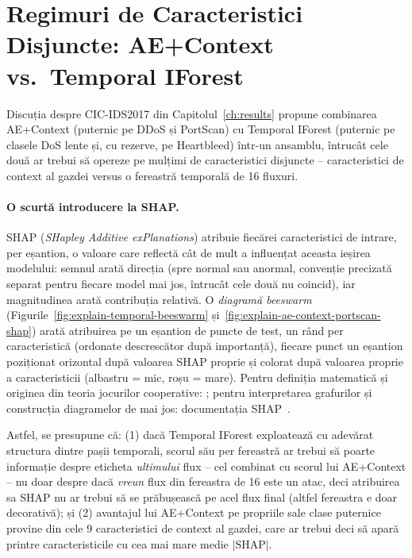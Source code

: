 \section{Regimuri de Caracteristici Disjuncte: AE+Context vs.\ Temporal IForest}
\label{sec:explain-disjoint-regime}

Discuția despre CIC-IDS2017 din Capitolul~\ref{ch:results} propune combinarea AE+Context (puternic pe DDoS și PortScan) cu Temporal IForest (puternic pe clasele DoS lente și, cu rezerve, pe Heartbleed) într-un ansamblu, întrucât cele două ar trebui să opereze pe mulțimi de caracteristici disjuncte
-- caracteristici de context al gazdei versus o fereastră temporală de 16 fluxuri.

\paragraph{O scurtă introducere la SHAP.} SHAP (\emph{SHapley Additive exPlanations}) atribuie fiecărei caracteristici de intrare, per eșantion, o valoare care reflectă cât de mult a influențat aceasta ieșirea modelului: semnul arată direcția (spre normal sau anormal, convenție precizată separat pentru fiecare model mai jos, întrucât cele două nu coincid), iar magnitudinea arată contribuția relativă.
O \emph{diagramă beeswarm} (Figurile~\ref{fig:explain-temporal-beeswarm} și~\ref{fig:explain-ae-context-portscan-shap}) arată atribuirea pe un eșantion de puncte de test, un rând per caracteristică (ordonate descrescător după importanță), fiecare punct un eșantion poziționat orizontal după valoarea SHAP proprie și colorat după valoarea proprie a caracteristicii (albastru = mic, roșu = mare). Pentru definiția matematică și originea din teoria jocurilor cooperative: \parencite{lundberg2017unified}; pentru interpretarea grafurilor și construcția diagramelor de mai jos: documentația SHAP~\cite{shap_docs}.

Astfel, se presupune că: (1) dacă Temporal IForest exploatează cu adevărat structura dintre pașii temporali, scorul său per fereastră ar trebui să poarte informație despre eticheta \emph{ultimului} flux -- cel combinat cu scorul lui AE+Context -- nu doar despre dacă \emph{vreun} flux din fereastra de 16 este un atac, deci atribuirea sa SHAP nu ar trebui să se prăbușească pe acel flux final (altfel fereastra e doar decorativă); și (2) avantajul lui AE+Context pe propriile sale clase puternice provine din cele 9 caracteristici de context al gazdei, care ar trebui deci să apară printre caracteristicile cu cea mai mare medie $|\text{SHAP}|$.

